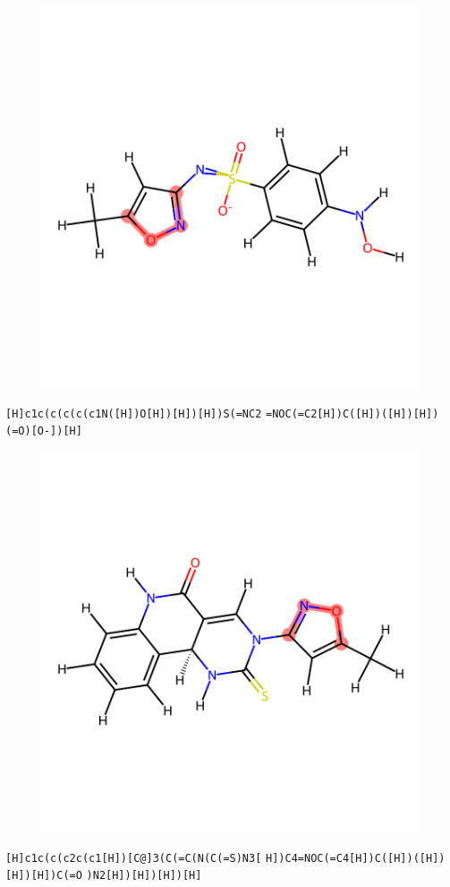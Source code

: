 \documentclass{article}
\begin{document}
\begin{figure}[ht]
\centering
    \includegraphics{mol236.png}
\end{figure}
\verb|[H]c1c(c(c(c(c1N([H])O[H])[H])[H])S(=NC2| \verb|=NOC(=C2[H])C([H])([H])[H])(=O)[O-])[H]|

\begin{figure}[ht]
\centering
    \includegraphics{mol237.png}
\end{figure}
\verb|[H]c1c(c(c2c(c1[H])[C@]3(C(=C(N(C(=S)N3[| \verb|H])C4=NOC(=C4[H])C([H])([H])[H])[H])C(=O| \verb|)N2[H])[H])[H])[H]|
\end{document}
